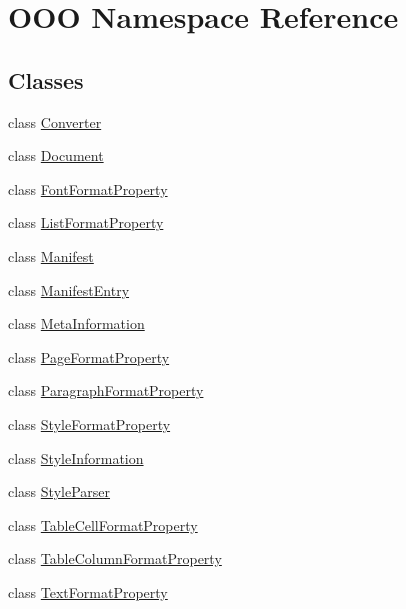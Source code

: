 \hypertarget{namespaceOOO}{\section{O\+O\+O Namespace Reference}
\label{namespaceOOO}
}
\subsection*{Classes}
\begin{DoxyCompactItemize}
\item 
class \hyperlink{classOOO_1_1Converter}{Converter}
\item 
class \hyperlink{classOOO_1_1Document}{Document}
\item 
class \hyperlink{classOOO_1_1FontFormatProperty}{Font\+Format\+Property}
\item 
class \hyperlink{classOOO_1_1ListFormatProperty}{List\+Format\+Property}
\item 
class \hyperlink{classOOO_1_1Manifest}{Manifest}
\item 
class \hyperlink{classOOO_1_1ManifestEntry}{Manifest\+Entry}
\item 
class \hyperlink{classOOO_1_1MetaInformation}{Meta\+Information}
\item 
class \hyperlink{classOOO_1_1PageFormatProperty}{Page\+Format\+Property}
\item 
class \hyperlink{classOOO_1_1ParagraphFormatProperty}{Paragraph\+Format\+Property}
\item 
class \hyperlink{classOOO_1_1StyleFormatProperty}{Style\+Format\+Property}
\item 
class \hyperlink{classOOO_1_1StyleInformation}{Style\+Information}
\item 
class \hyperlink{classOOO_1_1StyleParser}{Style\+Parser}
\item 
class \hyperlink{classOOO_1_1TableCellFormatProperty}{Table\+Cell\+Format\+Property}
\item 
class \hyperlink{classOOO_1_1TableColumnFormatProperty}{Table\+Column\+Format\+Property}
\item 
class \hyperlink{classOOO_1_1TextFormatProperty}{Text\+Format\+Property}
\end{DoxyCompactItemize}
